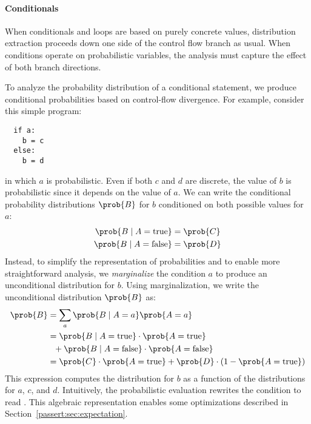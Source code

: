 
\label{passert:sec:conditionals}


\paragraph{Conditionals}
When conditionals and loops are based on purely
concrete values, distribution extraction proceeds down one side
of the control flow branch as usual. When conditions operate on probabilistic variables, the analysis
must capture the effect of both branch directions.

To analyze the probability distribution of a conditional statement,
we produce conditional probabilities
based on control-flow divergence. For example, consider this simple
program:
%
\begin{lstlisting}
  if a:
    b = c
  else:
    b = d
\end{lstlisting}
%
in which $a$ is probabilistic. Even if both $c$
and $d$ are discrete, the value of $b$ is probabilistic since it depends on
the value of $a$. We can write the conditional probability distributions $\prob{B}$
for $b$ conditioned on both possible values for $a$:
%
\begin{align*}
    \prob{B \;|\; A = \mathrm{true}} &= \prob{C}\\
    \prob{B \;|\; A = \mathrm{false}} &= \prob{D}
\end{align*}
%
Instead, to simplify the representation of probabilities and to enable more
straightforward analysis, we \emph{marginalize} the condition $a$ to
produce an unconditional distribution for $b$. Using marginalization, we
write the unconditional distribution $\prob{B}$ as:
%
\begin{align*}
    \prob{B} &= \sum_a \prob{B\;|\; A = a} \prob{A = a} \\
           &= \prob{B \;|\; A = \mathrm{true}} \cdot \prob{A = \mathrm{true}}
    \\
    & \> \> \> + \prob{B \;|\; A = \mathrm{false}} \cdot \prob{A = \mathrm{false}} \\
           &= \prob{C} \cdot \prob{A=\mathrm{true}}
            + \prob{D} \cdot (1 - \prob{A=\mathrm{true}})
\end{align*}
%
This expression computes the distribution for $b$ as a function of the
distributions for $a$, $c$, and $d$. Intuitively, the probabilistic evaluation rewrites
the condition to read . This algebraic
representation enables some optimizations described
in Section~\ref{passert:sec:expectation}.

